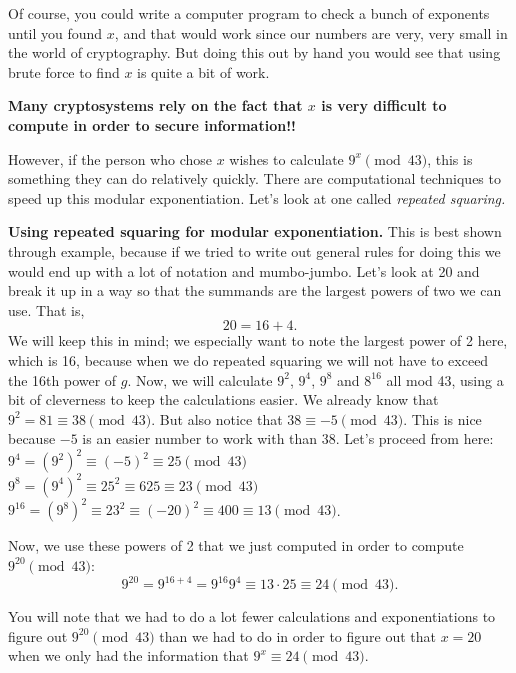 \documentclass[14pt, letter]{amsart}
\begin{document}
Of course, you could write a computer program to check a bunch of exponents until you found $x$, and that would work since our numbers are very, very small in the world of cryptography. But doing this out by hand you would see that using brute force to find $x$ is quite a bit of work. 

\textbf{Many cryptosystems rely on the fact that $x$ is very difficult to compute in order to secure information!!}

However, if the person who chose $x$ wishes to calculate $9^x\pmod{43}$, this is something they can do relatively quickly. There are computational techniques to speed up this modular exponentiation. Let's look at one called \textit{repeated squaring.}

\vspace{0.2in}

\noindent\textbf{Using repeated squaring for modular exponentiation.} This is best shown through example, because if we tried to write out general rules for doing this we would end up with a lot of notation and mumbo-jumbo. Let's look at 20 and break it up in a way so that the summands are the largest powers of two we can use. That is,
\[20 = 16+4.\] 
We will keep this in mind; we especially want to note the largest power of 2 here, which is 16, because when we do repeated squaring we will not have to exceed the 16th power of $g$. Now, we will calculate $9^2$, $9^4$, $9^8$ and $8^{16}$ all mod 43, using a bit of cleverness to keep the calculations easier. We already know that $9^2=81\equiv 38\pmod{43}$. But also notice that $38\equiv -5\pmod{43}$. This is nice because $-5$ is an easier number to work with than 38. Let's proceed from here:\\
$9^4 = (9^2)^2 \equiv (-5)^2\equiv 25\pmod{43}$\\
$9^8 = (9^4)^2 \equiv 25^2 \equiv 625\equiv 23\pmod{43}$\\
$9^{16}=(9^8)^2\equiv 23^2\equiv (-20)^2\equiv 400\equiv 13\pmod{43}$.

Now, we use these powers of 2 that we just computed in order to compute $9^{20}\pmod{43}$:
\[9^{20} = 9^{16+4} = 9^{16}9^4 \equiv 13\cdot 25\equiv 24\pmod{43}.\]

You will note that we had to do a lot fewer calculations and exponentiations to figure out $9^{20}\pmod{43}$ than we had to do in order to figure out that $x=20$ when we only had the information that $9^x\equiv 24\pmod 43$.

\vspace{0.2in}
\end{document}
